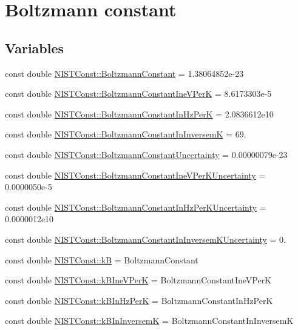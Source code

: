 \hypertarget{group___boltzmann_constant}{}\section{Boltzmann constant}
\label{group___boltzmann_constant}
\subsection*{Variables}
\begin{DoxyCompactItemize}
\item 
const double \hyperlink{group___boltzmann_constant_ga505057a2eb7e925fde668cc1025331df}{N\+I\+S\+T\+Const\+::\+Boltzmann\+Constant} = 1.\+38064852e-\/23
\item 
const double \hyperlink{group___boltzmann_constant_gad31ba56bbe6d4a0f40252ef7b48b52a3}{N\+I\+S\+T\+Const\+::\+Boltzmann\+Constant\+Ine\+V\+PerK} = 8.\+6173303e-\/5
\item 
const double \hyperlink{group___boltzmann_constant_ga5c59003e6fbd70482ee1bdaf7ea35b7a}{N\+I\+S\+T\+Const\+::\+Boltzmann\+Constant\+In\+Hz\+PerK} = 2.\+0836612e10
\item 
const double \hyperlink{group___boltzmann_constant_ga4f4d8adf824657420f54680daa6340d5}{N\+I\+S\+T\+Const\+::\+Boltzmann\+Constant\+In\+InversemK} = 69.
\item 
const double \hyperlink{group___boltzmann_constant_gaa32ac947c545e70076f0e08aceb3ce16}{N\+I\+S\+T\+Const\+::\+Boltzmann\+Constant\+Uncertainty} = 0.\+00000079e-\/23
\item 
const double \hyperlink{group___boltzmann_constant_ga6a1c42c4e69994962116d279d6f49203}{N\+I\+S\+T\+Const\+::\+Boltzmann\+Constant\+Ine\+V\+Per\+K\+Uncertainty} = 0.\+0000050e-\/5
\item 
const double \hyperlink{group___boltzmann_constant_gaa87e06f419f94e4ea1ac8dcd769537ee}{N\+I\+S\+T\+Const\+::\+Boltzmann\+Constant\+In\+Hz\+Per\+K\+Uncertainty} = 0.\+0000012e10
\item 
const double \hyperlink{group___boltzmann_constant_gadb520d4ce5d980c8ba24d9499f500873}{N\+I\+S\+T\+Const\+::\+Boltzmann\+Constant\+In\+Inversem\+K\+Uncertainty} = 0.
\item 
const double \hyperlink{group___boltzmann_constant_ga6c7ead5913113ec6e980e80f21d27fd0}{N\+I\+S\+T\+Const\+::kB} = Boltzmann\+Constant
\item 
const double \hyperlink{group___boltzmann_constant_gae6941828181b77b14f5f24a8b713570f}{N\+I\+S\+T\+Const\+::k\+B\+Ine\+V\+PerK} = Boltzmann\+Constant\+Ine\+V\+PerK
\item 
const double \hyperlink{group___boltzmann_constant_gaa7a3aa5798c9617d09120f8041c93433}{N\+I\+S\+T\+Const\+::k\+B\+In\+Hz\+PerK} = Boltzmann\+Constant\+In\+Hz\+PerK
\item 
const double \hyperlink{group___boltzmann_constant_ga54bf445c848dc6dc425076bf6ab45d83}{N\+I\+S\+T\+Const\+::k\+B\+In\+InversemK} = Boltzmann\+Constant\+In\+InversemK
\end{DoxyCompactItemize}


